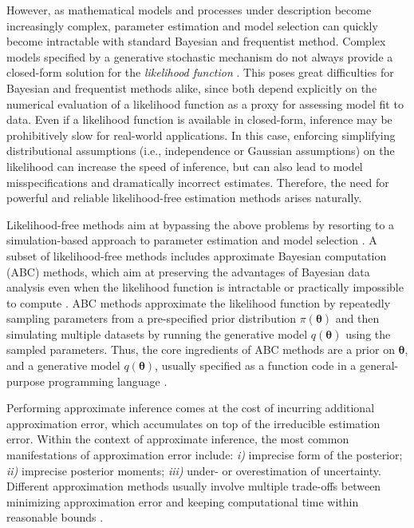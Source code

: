 \documentclass[9pt,twoside,lineno]{pnas-new}
\begin{document}
However, as mathematical models and processes under description become increasingly complex, parameter estimation and model selection can quickly become intractable with standard Bayesian and frequentist method. Complex models specified by a generative stochastic mechanism do not always provide a closed-form solution for the \textit{likelihood function} \cite{palestro2018likelihood, csillery2010approximate, toni2009simulation}. This poses great difficulties for Bayesian and frequentist methods alike, since both depend explicitly on the numerical evaluation of a likelihood function as a proxy for assessing model fit to data. Even if a likelihood function is available in closed-form, inference may be prohibitively slow for real-world applications. In this case, enforcing simplifying distributional assumptions (i.e., independence or Gaussian assumptions) on the likelihood can increase the speed of inference, but can also lead to model misspecifications and dramatically incorrect estimates. Therefore, the need for powerful and reliable likelihood-free estimation methods arises naturally. 

Likelihood-free methods aim at bypassing the above problems by resorting to a simulation-based approach to parameter estimation and model selection \cite{palestro2018likelihood, turner2014generalized}. A subset of likelihood-free methods includes approximate Bayesian computation (ABC) methods, which aim at preserving the advantages of Bayesian data analysis even when the likelihood function is intractable or practically impossible to compute \cite{turner2014generalized, sunnaaker2013approximate, csillery2010approximate}. ABC methods approximate the likelihood function by repeatedly sampling parameters from a pre-specified prior distribution $\pi(\boldsymbol{\theta})$ and then simulating multiple datasets by running the generative model $q(\boldsymbol{\theta})$ using the sampled parameters. Thus, the core ingredients of ABC methods are a prior on $\boldsymbol{\theta}$, and a generative model $q(\boldsymbol{\theta})$, usually specified as a function code in a general-purpose programming language \cite{csillery2010approximate, mertens2018abrox}.

Performing approximate inference comes at the cost of incurring additional approximation error, which accumulates on top of the irreducible estimation error. Within the context of approximate inference, the most common manifestations of approximation error include: \textit{i)} imprecise form of the posterior; \textit{ii)} imprecise posterior moments; \textit{iii)} under- or overestimation of uncertainty. Different approximation methods usually involve multiple trade-offs between minimizing approximation error and keeping computational time within reasonable bounds \cite{frazier2018asymptotic, palestro2018likelihood}.
\end{document}
